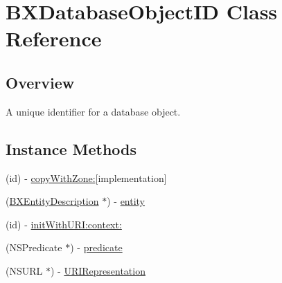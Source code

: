 \hypertarget{interface_b_x_database_object_i_d}{}\section{B\+X\+Database\+Object\+I\+D Class Reference}
\label{interface_b_x_database_object_i_d}


\subsection{Overview}
A unique identifier for a database object. \subsection*{Instance Methods}
\begin{DoxyCompactItemize}
\item 
\hypertarget{interface_b_x_database_object_i_d_a75cf4f8ce403032759f475abb64d0b15}{}(id) -\/ \hyperlink{interface_b_x_database_object_i_d_a75cf4f8ce403032759f475abb64d0b15}{copy\+With\+Zone\+:}{\ttfamily  \mbox{[}implementation\mbox{]}}\label{interface_b_x_database_object_i_d_a75cf4f8ce403032759f475abb64d0b15}

\item 
\hypertarget{interface_b_x_database_object_i_d_a9aaca68782823f4b01b315b378f5af86}{}(\hyperlink{interface_b_x_entity_description}{B\+X\+Entity\+Description} $\ast$) -\/ \hyperlink{interface_b_x_database_object_i_d_a9aaca68782823f4b01b315b378f5af86}{entity}\label{interface_b_x_database_object_i_d_a9aaca68782823f4b01b315b378f5af86}

\item 
(id) -\/ \hyperlink{interface_b_x_database_object_i_d_a3af48f5a2b7f3bc4d3d3504a9c9bd327}{init\+With\+U\+R\+I\+:context\+:}
\item 
\hypertarget{interface_b_x_database_object_i_d_adf5263517c14cba9ba5cbbf62328743f}{}(N\+S\+Predicate $\ast$) -\/ \hyperlink{interface_b_x_database_object_i_d_adf5263517c14cba9ba5cbbf62328743f}{predicate}\label{interface_b_x_database_object_i_d_adf5263517c14cba9ba5cbbf62328743f}

\item 
\hypertarget{interface_b_x_database_object_i_d_a07a3888859856043f99c9209cb6c40c3}{}(N\+S\+U\+R\+L $\ast$) -\/ \hyperlink{interface_b_x_database_object_i_d_a07a3888859856043f99c9209cb6c40c3}{U\+R\+I\+Representation}\label{interface_b_x_database_object_i_d_a07a3888859856043f99c9209cb6c40c3}

\end{DoxyCompactItemize}


